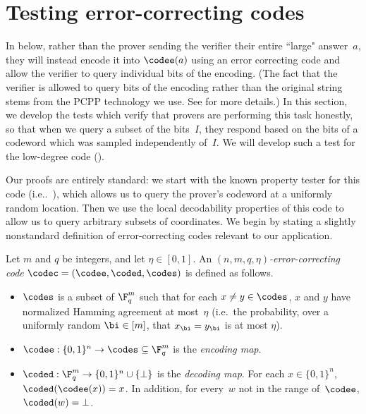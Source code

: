 \section{Testing error-correcting codes}\label{sec:error}

In  below,
rather than the prover sending the verifier their entire ``large" answer~$a$,
they will instead encode it into $\codee(a)$ using an error correcting code
and allow the verifier to query individual bits of the encoding.
(The fact that the verifier is allowed to query bits of the encoding rather than the original string
stems from the PCPP technology we use. See  for more details.)
In this section, we develop the tests which verify that provers are performing this task honestly,
so that when we query a subset of the bits~$I$,
they respond based on the bits of a codeword which was sampled independently of~$I$.
We will develop such a test for the low-degree code ().

Our proofs are entirely standard: we start with the known property tester for this code (i.e..\ ),
which allows us to query the prover's codeword at a uniformly random location.
Then we use the local decodability properties of this code to allow us to query arbitrary subsets of coordinates.
We begin by stating a slightly nonstandard definition of error-correcting codes relevant to our application.

\begin{definition}\label{def:error-correcting-code}
Let $m$ and $q$ be integers,
and let $\eta \in [0, 1]$.
An \emph{$(n, m, q, \eta)$-error-correcting code} $\codec = (\codee,\coded,\codes)$ is defined as follows.
\begin{itemize}
\item[$\circ$] $\codes$ is a subset of $\F_q^m$ such that for each $x \neq y \in \codes$, $x$ and $y$ have normalized Hamming agreement at most~$\eta$
		(i.e.\ the probability, over a uniformly random $\bi \in [m]$, that $x_{\bi} = y_{\bi}$ is at most $\eta$).
\item[$\circ$] $\codee:\{0, 1\}^n \rightarrow \codes \subseteq \F_q^m$ is the \emph{encoding map}.
\item[$\circ$] $\coded: \F_q^m \rightarrow \{0, 1\}^n \cup \{\bot\}$ is the \emph{decoding map}.
		For each $x \in \{0, 1\}^n$, $\coded(\codee(x)) = x$.
		In addition, for every~$w$ not in the range of~$\codee$, $\coded(w) = \bot$.
\end{itemize}
\end{definition}

